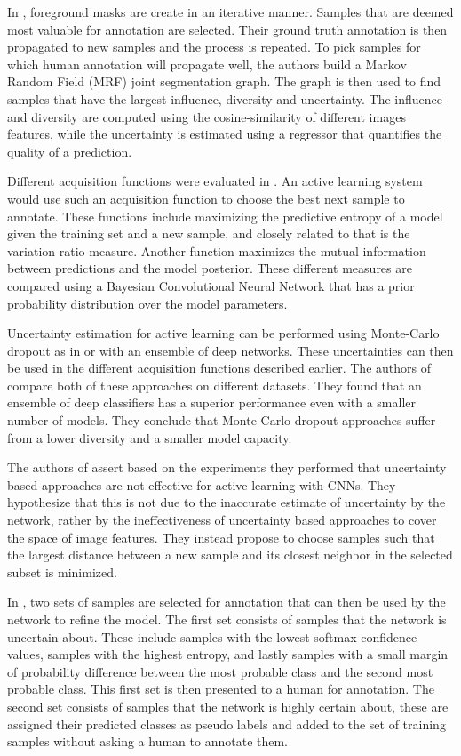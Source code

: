 \documentclass[letterpaper, 10 pt, conference]{ieeeconf}  %
\begin{document}
In \cite{dutt2016active}, foreground masks are create in an iterative manner. Samples that are deemed most valuable for annotation are selected. Their ground truth annotation is then propagated to new samples and the process is repeated. To pick samples for which human annotation will propagate well, the authors build a Markov Random Field (MRF) joint segmentation graph. The graph is then used to find samples that have the largest influence, diversity and uncertainty. The influence and diversity are computed using the cosine-similarity of different images features, while the uncertainty is estimated using a regressor that quantifies the quality of a prediction. 

Different acquisition functions were evaluated in \cite{gal2017deep}. An active learning system would use such an acquisition function to choose the best next sample to annotate. These functions include maximizing the predictive entropy of a model given the training set and a new sample, and closely related to that is the variation ratio measure. Another function maximizes the mutual information between predictions and the model posterior. These different measures are compared using a Bayesian Convolutional Neural Network that has a prior probability distribution over the model parameters.  

Uncertainty estimation for active learning can be performed using Monte-Carlo dropout as in \cite{gal2017deep} or with an ensemble of deep networks. These uncertainties can then be used in the different acquisition functions described earlier. The authors of \cite{beluch2018power} compare both of these approaches on different datasets. They found that an ensemble of deep classifiers has a superior performance even with a smaller number of models. They conclude that Monte-Carlo dropout approaches suffer from a lower diversity and a smaller model capacity.

The authors of \cite{sener2017geometric} assert based on the experiments they performed that uncertainty based approaches are not effective for active learning with CNNs. They hypothesize that this is not due to the inaccurate estimate of uncertainty by the network, rather by the ineffectiveness of uncertainty based approaches to cover the space of image features. They instead propose to choose samples such that the largest distance between a new sample and its closest neighbor in the selected subset is minimized.

In \cite{wang2017cost}, two sets of samples are selected for annotation that can then be used by the network to refine the model. The first set consists of samples that the network is uncertain about. These include samples with the lowest softmax confidence values, samples with the highest entropy, and lastly samples with a small margin of probability difference between the most probable class and the second most probable class. This first set is then presented to a human for annotation. The second set consists of samples that the network is highly certain about, these are assigned their predicted classes as pseudo labels and added to the set of training samples without asking a human to annotate them.
\end{document}
